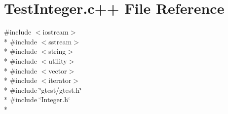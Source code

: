 \hypertarget{TestInteger_8c_09_09}{\section{Test\-Integer.\-c++ File Reference}
\label{TestInteger_8c_09_09}
}
{\ttfamily \#include $<$iostream$>$}\\*
{\ttfamily \#include $<$sstream$>$}\\*
{\ttfamily \#include $<$string$>$}\\*
{\ttfamily \#include $<$utility$>$}\\*
{\ttfamily \#include $<$vector$>$}\\*
{\ttfamily \#include $<$iterator$>$}\\*
{\ttfamily \#include \char`\"{}gtest/gtest.\-h\char`\"{}}\\*
{\ttfamily \#include \char`\"{}Integer.\-h\char`\"{}}\\*

